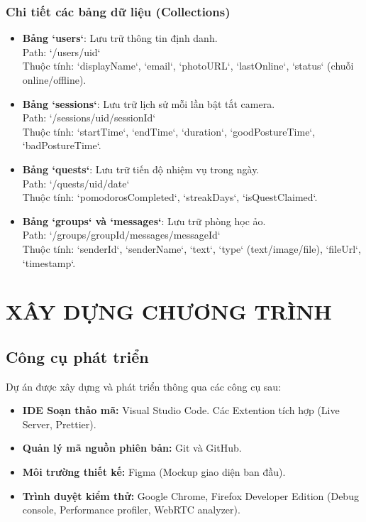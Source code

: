 \documentclass[12pt,a4paper]{report}
\begin{document}
\subsection{Chi tiết các bảng dữ liệu (Collections)}
\begin{itemize}
    \item \textbf{Bảng `users`}: Lưu trữ thông tin định danh.\\
    Path: `/users/{uid}`\\
    Thuộc tính: `displayName`, `email`, `photoURL`, `lastOnline`, `status` (chuỗi online/offline).
    
    \item \textbf{Bảng `sessions`}: Lưu trữ lịch sử mỗi lần bật tắt camera.\\
    Path: `/sessions/{uid}/{sessionId}`\\
    Thuộc tính: `startTime`, `endTime`, `duration`, `goodPostureTime`, `badPostureTime`.
    
    \item \textbf{Bảng `quests`}: Lưu trữ tiến độ nhiệm vụ trong ngày.\\
    Path: `/quests/{uid}/{date}`\\
    Thuộc tính: `pomodorosCompleted`, `streakDays`, `isQuestClaimed`.
    
    \item \textbf{Bảng `groups` và `messages`}: Lưu trữ phòng học ảo.\\
    Path: `/groups/{groupId}/messages/{messageId}`\\
    Thuộc tính: `senderId`, `senderName`, `text`, `type` (text/image/file), `fileUrl`, `timestamp`.
\end{itemize}

\chapter{XÂY DỰNG CHƯƠNG TRÌNH}

\section{Công cụ phát triển}
Dự án được xây dựng và phát triển thông qua các công cụ sau:
\begin{itemize}
    \item \textbf{IDE Soạn thảo mã:} Visual Studio Code. Các Extention tích hợp (Live Server, Prettier).
    \item \textbf{Quản lý mã nguồn phiên bản:} Git và GitHub.
    \item \textbf{Môi trường thiết kế:} Figma (Mockup giao diện ban đầu).
    \item \textbf{Trình duyệt kiểm thử:} Google Chrome, Firefox Developer Edition (Debug console, Performance profiler, WebRTC analyzer).
\end{itemize}
\end{document}
